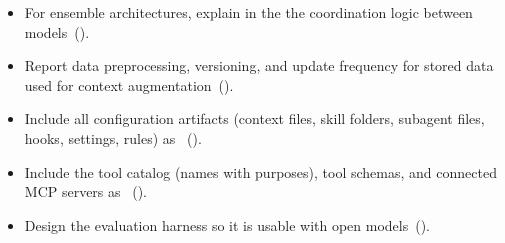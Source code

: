 \begin{itemize}[label={},leftmargin=*]
    \item \iconS {} For ensemble architectures, explain in the \paper the coordination logic between models~().
    \item \iconS {} Report data preprocessing, versioning, and update frequency for stored data used for context augmentation~().
    \item \iconS {} Include all configuration artifacts (context files, skill folders, subagent files, hooks, settings, rules) as \supplementarymaterial~().
    \item \iconS {} Include the tool catalog (names with purposes), tool schemas, and connected MCP servers as \supplementarymaterial~().
    \item \iconS {} Design the evaluation harness so it is usable with open models~().
\end{itemize}

